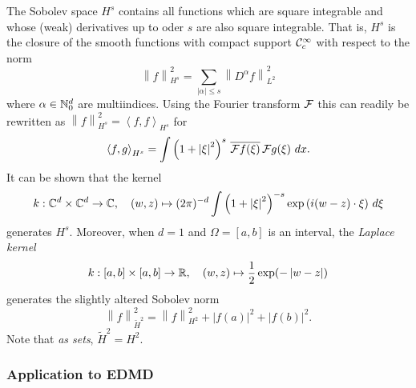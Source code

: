 \begin{example}
    The Sobolev space $H^s$ contains all functions which are square integrable and whose 
    (weak) derivatives up to oder $s$ are also square integrable. That is, $H^s$ is the 
    closure of the smooth functions with compact support $\mathcal{C}^\infty_c$ with respect 
    to the norm 
    \begin{equation}
        \left\| f \right\|_{H^s}^2 = 
        \sum_{| \alpha | \leq s} \left\| D^\alpha f \right\|_{L^2}^2
    \end{equation}
    where $\alpha \in \mathbb{N}_0^d$ are multiindices. 
    Using the Fourier transform $\mathcal{F}$ this can readily be rewritten as 
    $\left\| f \right\|_{H^s}^2 = \left\langle f, f \right\rangle_{H^s}$ for
    \begin{equation}
        \left\langle f, g \right\rangle_{H^s} = 
        \int \left( 1 + \left| \xi \right|^2 \right)^s 
        \,\overline{ \mathcal{F} f (\xi) }\, \mathcal{F} g (\xi) \ dx . 
    \end{equation}
    It can be shown \cite{RKHS} that the kernel 
    \begin{equation}
        k : \mathbb{C}^d \times \mathbb{C}^d \to \mathbb{C}, \quad (w, z) \mapsto 
        (2 \pi)^{-d} \int \left( 1 + \left| \xi \right|^2 \right)^{-s} 
        \exp \left( i (w - z) \cdot \xi \right) \,d\xi 
    \end{equation}
    generates $H^s$. Moreover, when $d=1$ and $\Omega = [a, b]$ is an interval, the 
    \emph{Laplace kernel} 
    \begin{equation}
        k : [a,b] \times [a,b] \to \mathbb{R}, \quad (w, z) \mapsto 
        \frac{1}{2} \exp ( - \left| w - z \right| )
    \end{equation}
    generates the slightly altered Sobolev norm
    \begin{equation}
        \left\| f \right\|_{\tilde{H}^2}^2 = \left\| f \right\|_{H^2}^2 
        + \left| f(a) \right|^2 
        + \left| f(b) \right|^2 . 
    \end{equation}
    Note that \emph{as sets}, $\tilde{H}^2 = H^2$. 
\end{example}


\subsubsection{Application to EDMD}


